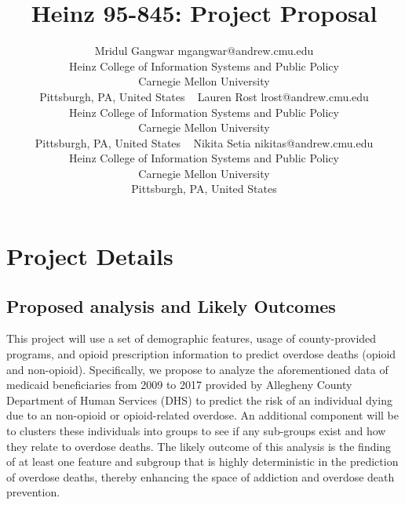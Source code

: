 \documentclass[twoside,11pt]{article}
\begin{document}
\title{Heinz 95-845: Project Proposal}

\author{\name Mridul Gangwar \email mgangwar@andrew.cmu.edu \\
       \addr Heinz College of Information Systems and Public Policy\\
       Carnegie Mellon University\\
       Pittsburgh, PA, United States \
       \AND
       \name Lauren Rost \email lrost@andrew.cmu.edu \\
       \addr Heinz College of Information Systems and Public Policy\\
       Carnegie Mellon University\\
       Pittsburgh, PA, United States \
       \AND
       \name Nikita Setia \email nikitas@andrew.cmu.edu \\
       \addr Heinz College of Information Systems and Public Policy\\
       Carnegie Mellon University\\
       Pittsburgh, PA, United States}
\maketitle

\section{Project Details} \label{details}

\subsection{Proposed analysis and Likely Outcomes}
This project will use a set of demographic features, usage of county-provided programs, and opioid prescription information to predict overdose deaths (opioid and non-opioid). Specifically, we propose to analyze the aforementioned data of medicaid beneficiaries from 2009 to 2017 provided by Allegheny County Department of Human Services (DHS) to predict the risk of an individual dying due to an non-opioid or opioid-related overdose. An additional component will be to clusters these individuals into groups to see if any sub-groups exist and how they relate to overdose deaths. The likely outcome of this analysis is the finding of at least one feature and subgroup that is highly deterministic in the prediction of overdose deaths, thereby enhancing the space of addiction and overdose death prevention. 
\end{document}
